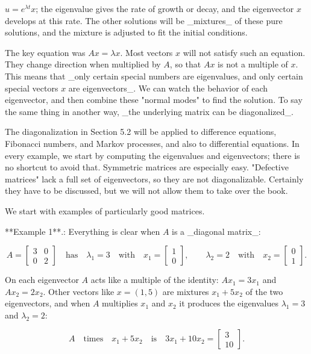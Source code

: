 \(u=e^{\lambda t}x\); the eigenvalue gives the rate of growth or decay, and the eigenvector \(x\) develops at this rate. The other solutions will be _mixtures_ of these pure solutions, and the mixture is adjusted to fit the initial conditions.

The key equation was \(Ax=\lambda x\). Most vectors \(x\) will not satisfy such an equation. They change direction when multiplied by \(A\), so that \(Ax\) is not a multiple of \(x\). This means that _only certain special numbers are eigenvalues, and only certain special vectors \(x\) are eigenvectors_. We can watch the behavior of each eigenvector, and then combine these "normal modes" to find the solution. To say the same thing in another way, _the underlying matrix can be diagonalized_.

The diagonalization in Section 5.2 will be applied to difference equations, Fibonacci numbers, and Markov processes, and also to differential equations. In every example, we start by computing the eigenvalues and eigenvectors; there is no shortcut to avoid that. Symmetric matrices are especially easy. "Defective matrices" lack a full set of eigenvectors, so they are not diagonalizable. Certainly they have to be discussed, but we will not allow them to take over the book.

We start with examples of particularly good matrices.

**Example 1**.: Everything is clear when \(A\) is a _diagonal matrix_:

\[A=\begin{bmatrix}3&0\\ 0&2\end{bmatrix}\quad\text{has}\quad\lambda_{1}=3\quad\text{with}\quad x_{1}= \begin{bmatrix}1\\ 0\end{bmatrix},\qquad\lambda_{2}=2\quad\text{with}\quad x_{2}=\begin{bmatrix} 0\\ 1\end{bmatrix}.\]

On each eigenvector \(A\) acts like a multiple of the identity: \(Ax_{1}=3x_{1}\) and \(Ax_{2}=2x_{2}\). Other vectors like \(x=(1,5)\) are mixtures \(x_{1}+5x_{2}\) of the two eigenvectors, and when \(A\) multiplies \(x_{1}\) and \(x_{2}\) it produces the eigenvalues \(\lambda_{1}=3\) and \(\lambda_{2}=2\):

\[A\quad\text{times}\quad x_{1}+5x_{2}\quad\text{is}\quad 3x_{1}+10x_{2}= \begin{bmatrix}3\\ 10\end{bmatrix}.\]

